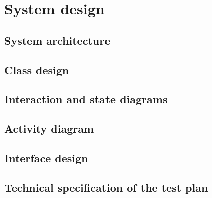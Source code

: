 \renewcommand{\documentname}{System design}

\chapter{System design}


\section{System architecture}

\section{Class design}

\section{Interaction and state diagrams}

\section{Activity diagram}

\section{Interface design}

\section{Technical specification of the test plan}


